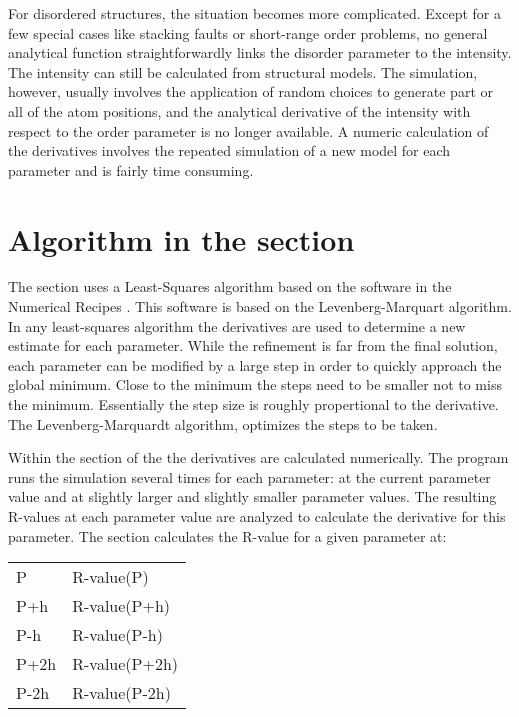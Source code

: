 For disordered structures, the situation becomes more complicated.
Except for a few special cases like stacking faults or short-range
order problems, no general analytical function straightforwardly 
links the disorder parameter to the intensity. The intensity 
can still be calculated from structural models. The simulation,
however, usually involves the application of random choices 
to generate part or all of the atom positions, and the analytical
derivative of the intensity with respect to the order parameter
is no longer available. A numeric calculation of the derivatives
involves the repeated simulation of a new model for each parameter
and is fairly time consuming.

\section{Algorithm in the \Refine section \label{lsq-refine}}

The \Refine section uses a Least-Squares algorithm based on the software 
in the Numerical Recipes \cite{prflteve1989}. This software is based on the 
Levenberg-Marquart
algorithm. In any least-squares algorithm the derivatives are used to determine
a new estimate for each parameter. While the refinement is far from the final 
solution, each parameter can be modified by a large step in order to quickly 
approach the global minimum. Close to the minimum the steps need to be smaller
not to miss the minimum. Essentially the step size is roughly propertional to 
the derivative. The Levenberg-Marquardt algorithm, optimizes the steps to be
taken.

Within the \Refine section of the \Suite the derivatives are calculated
numerically. The program runs the simulation several times for each parameter:
at the current parameter value and at slightly larger and slightly smaller 
parameter values. The resulting R-values at each parameter value are analyzed
to calculate the derivative for this parameter. The \Refine section calculates
the R-value for a given parameter at:

\begin{tabular}{l|l}
  P & R-value(P) \\
  P+h & R-value(P+h) \\
  P-h & R-value(P-h) \\
  P+2h & R-value(P+2h) \\
  P-2h & R-value(P-2h) \\
\end{tabular}

